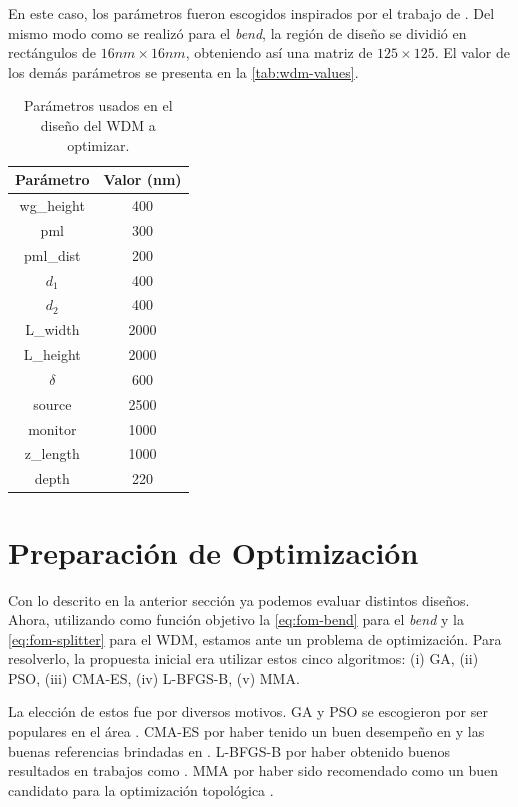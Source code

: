 En este caso, los parámetros fueron escogidos inspirados por el trabajo de \cite{Christiansen2021}.
Del mismo modo como se realizó para el \emph{bend}, 
la región de diseño se dividió en rectángulos de $16nm \times 16 nm$, obteniendo así una
matriz de $125 \times 125$.
El valor de los demás parámetros se presenta en la \autoref{tab:wdm-values}.

\begin{table}[ht]
    \centering
    \begin{tabular}{|c|c|}
    \hline 
    Parámetro &  Valor (nm) \\
    \hline 
    wg\_height & 400 \\
    pml & 300 \\
    pml\_dist & 200 \\
    $d_1$ & 400 \\
    $d_2$ & 400 \\
    L\_width & 2000 \\
    L\_height & 2000 \\
    $\delta$ & 600 \\
    source & 2500 \\
    monitor & 1000 \\
    z\_length & 1000 \\
    depth & 220 \\
    \hline 
    \end{tabular}
    \caption{Parámetros usados en el diseño del WDM a optimizar.}
    \label{tab:wdm-values}
\end{table}


\section{Preparación de Optimización}

Con lo descrito en la anterior sección ya podemos evaluar distintos diseños.
Ahora, utilizando como función objetivo la \autoref{eq:fom-bend} para el \emph{bend} y 
la \autoref{eq:fom-splitter} para el WDM,
estamos ante un problema de optimización.
Para resolverlo, la propuesta inicial era utilizar estos cinco algoritmos:
(i) GA, (ii) PSO, (iii) CMA-ES, (iv) L-BFGS-B, (v) MMA.

La elección de estos fue por diversos motivos.
GA y PSO se escogieron por ser populares en el área \citep{Elsawy2020, Molesky2018, Prosopio-Galarza2019}.
CMA-ES por haber tenido un buen desempeño en \cite{Gregory2015} y las buenas referencias brindadas en
\cite{Campbell2019}.
L-BFGS-B por haber obtenido buenos resultados en trabajos como \cite{Su2020}.
MMA por haber sido recomendado como un buen candidato para la optimización topológica \citep{Christiansen2021}.


